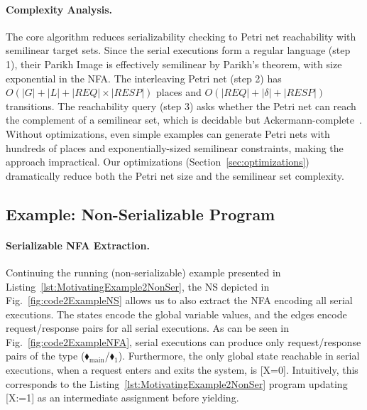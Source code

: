 \paragraph{Complexity Analysis.}
The core algorithm reduces serializability checking to Petri net reachability with semilinear target sets. 
Since the serial executions form a regular language (step 1), their Parikh Image is effectively semilinear by Parikh's theorem, with size exponential in the NFA.
The interleaving Petri net (step 2) has $O(|G| + |L| + |\mathit{REQ}| \times |\mathit{RESP}|)$ places and $O(|\mathit{REQ}| + |\delta| + |\mathit{RESP}|)$ transitions.
The reachability query (step 3) asks whether the Petri net can reach the complement of a semilinear set, which is decidable but Ackermann-complete~\cite{CzWo22}.
Without optimizations, even simple examples can generate Petri nets with hundreds of places and exponentially-sized semilinear constraints, making the approach impractical.
Our optimizations (Section~\ref{sec:optimizations}) dramatically reduce both the Petri net size and the semilinear set complexity.


%


\subsection{Example: Non-Serializable Program}
\label{subsec:ns-not-serializable}

\paragraph{Serializable NFA Extraction.}

Continuing the running (non-serializable) example presented in Listing~\ref{lst:MotivatingExample2NonSer}, the NS depicted in Fig.~\ref{fig:code2ExampleNS} allows us to also extract the NFA encoding all serial executions. The states encode the global variable values, and the edges encode request/response pairs for all serial executions. As can be seen in Fig.~\ref{fig:code2ExampleNFA}, serial executions can produce only request/response pairs of the type ({\color{ForestGreen}$\blacklozenge_\text{main}$/{\color{red}$\blacklozenge_1$}}). Furthermore, the only global state reachable in serial executions, when a request enters and exits the system, is [X=0].
%
Intuitively, this corresponds to the Listing~\ref{lst:MotivatingExample2NonSer} program updating [X:=1] as an intermediate assignment before yielding.

